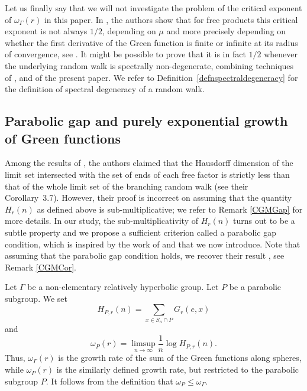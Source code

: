 \documentclass{amsart}
\newcommand{\showcomments}{yes}
\newenvironment{comment}%
{\ifthenelse{\equal{\showcomments}{yes}}%
{\footnotemark
    \begin{lrbox}{\commentbox}
    \begin{minipage}[t]{1.25in}\raggedright\sffamily\upshape\tiny
    \footnotemark[\arabic{footnote}]}%
{\begin{lrbox}{\commentbox}}}%
{\ifthenelse{\equal{\showcomments}{yes}}%
{\end{minipage}\end{lrbox}\marginpar{\usebox{\commentbox}}}%
{\end{lrbox}}}
\theoremstyle{definition}
\theoremstyle{remark}
\begin{document}
\medskip
Let us finally say that we will not investigate the problem of the critical exponent of $\omega_\Gamma(r)$ in this paper.
In \cite{CandelleroGilchMuller}, the authors show that for free products this critical exponent is not always $1/2$, depending on $\mu$ and more precisely depending on whether the first derivative of the Green function is finite or infinite at its radius of convergence, see \cite[Theorem~3.10]{CandelleroGilchMuller}.
It might be possible to prove that it is in fact $1/2$ whenever the underlying random walk is spectrally non-degenerate, combining techniques of \cite{SWX}, \cite{DussauleLLT2} and of the present paper.
We refer to Definition~\ref{defnspectraldegeneracy} for the definition of spectral degeneracy of a random walk.

\subsection{Parabolic gap and purely exponential growth of Green functions}
Among the results of \cite{CandelleroGilchMuller}, the authors claimed that the Hausdorff dimension of the limit set  intersected with the set of ends  of each free factor is strictly less than that of  the  whole limit set of the branching random walk (see their Corollary~3.7).
However, their proof is incorrect on assuming that the quantity $H_r(n)$ as defined above is sub-multiplicative; we refer to Remark \ref{CGMGap}   for more details.
In our study, the sub-multiplicativity of $H_r(n)$   turns out to be a  subtle property and we propose a sufficient criterion called a parabolic gap condition, which is inspired by the work of \cite{DOP} and that we now introduce.
Note that assuming that the parabolic gap condition holds, we recover their result \cite[Corollary~3.7]{CandelleroGilchMuller}, see     Remark \ref{CGMCor}.


Let $\Gamma$ be a non-elementary relatively hyperbolic group.
Let $P$ be a parabolic subgroup.
We set
$$H_{P,r}(n)=\sum_{x\in S_n\cap P}G_r(e,x)$$
and
$$\omega_P(r)=\limsup_{n\to \infty}\frac{1}{n}\log H_{P,r}(n).$$
Thus, $\omega_\Gamma(r)$ is the growth rate of the sum of the Green functions along spheres, while $\omega_P(r)$ is the similarly defined growth rate, but restricted to the parabolic subgroup $P$.
It follows from the definition that $\omega_P\leq \omega_\Gamma$.
\end{document}
